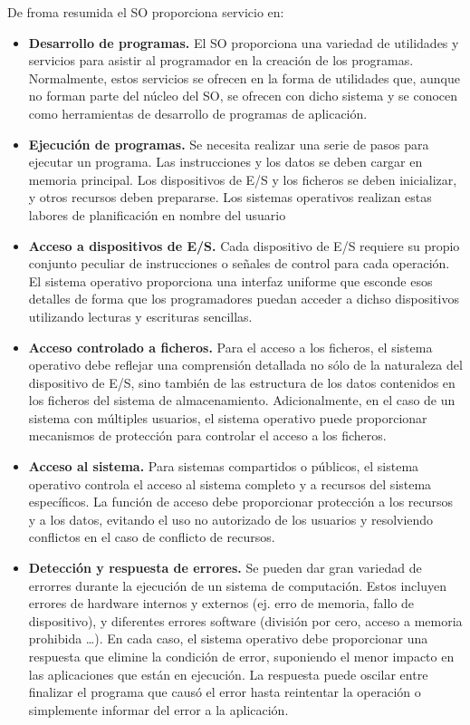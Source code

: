 \documentclass{article}
\begin{document}
					De froma resumida el SO proporciona servicio en:
					\begin{itemize}
					\item \textbf{Desarrollo de programas.} El SO proporciona una variedad de utilidades y servicios para asistir al programador en la creación de los programas. Normalmente, estos servicios se ofrecen en la forma de utilidades que, aunque no forman parte del núcleo del SO, se ofrecen con dicho sistema y se conocen como herramientas de desarrollo de programas de aplicación.
				
					\item \textbf{Ejecución de programas.} Se necesita realizar una serie de pasos para ejecutar un programa. Las instrucciones y los datos se deben cargar en memoria principal. Los dispositivos de E/S y los ficheros se deben inicializar, y otros recursos deben prepararse. Los sistemas operativos realizan estas labores de planificación en nombre del usuario
				
					\item \textbf{Acceso a dispositivos de E/S.} Cada dispositivo de E/S requiere su propio conjunto peculiar de instrucciones o señales de control para cada operación. El sistema operativo proporciona una interfaz uniforme que esconde esos detalles de forma que los programadores puedan acceder a dichso dispositivos utilizando lecturas y escrituras sencillas.
				
					\item \textbf{Acceso controlado a ficheros.} Para el acceso a los ficheros, el sistema operativo debe reflejar una comprensión detallada no sólo de la naturaleza del dispositivo de E/S, sino también de las estructura de los datos contenidos en los ficheros del sistema de almacenamiento. Adicionalmente, en el caso de un sistema con múltiples usuarios, el sistema operativo puede proporcionar mecanismos de protección para controlar el acceso a los ficheros.
				
					\item \textbf{Acceso al sistema.} Para sistemas compartidos o públicos, el sistema operativo controla el acceso al sistema completo y a recursos del sistema específicos. La función de acceso debe proporcionar protección a los recursos y a los datos, evitando el uso no autorizado de los usuarios y resolviendo conflictos en el caso de conflicto de recursos.
				
					\item \textbf{Detección y respuesta de errores.} Se pueden dar gran variedad de errorres durante la ejecución de un sistema de computación. Estos incluyen errores de hardware internos y externos (ej. erro de memoria, fallo de dispositivo), y diferentes errores software (división por cero, acceso a memoria prohibida \ldots). En cada caso, el sistema operativo debe proporcionar una respuesta que elimine la condición de error, suponiendo el menor impacto en las aplicaciones que están en ejecución. La respuesta puede oscilar entre finalizar el programa que causó el error hasta reintentar la operación o simplemente informar del error a la aplicación.
				

\end{itemize}
\end{document}
